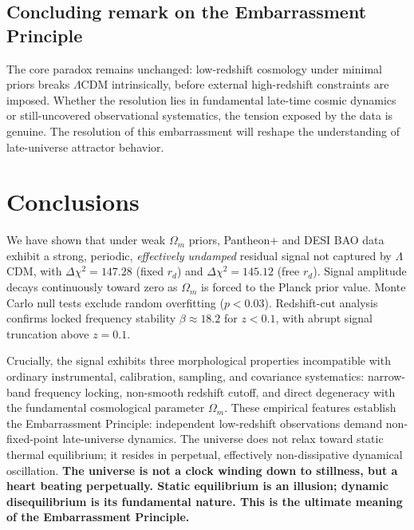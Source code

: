 \documentclass[10pt,a4paper,twocolumn]{article}
\begin{document}
\subsection{Concluding remark on the Embarrassment Principle}
The core paradox remains unchanged: low-redshift cosmology under minimal priors breaks $\Lambda$CDM intrinsically, before external high-redshift constraints are imposed. Whether the resolution lies in fundamental late-time cosmic dynamics or still-uncovered observational systematics, the tension exposed by the data is genuine. The resolution of this embarrassment will reshape the understanding of late-universe attractor behavior.

\section{Conclusions}
We have shown that under weak $\Omega_m$ priors, Pantheon+ and DESI BAO data exhibit a strong, periodic, \emph{effectively undamped} residual signal not captured by $\Lambda$CDM, with $\Delta\chi^2=147.28$ (fixed $r_d$) and $\Delta\chi^2=145.12$ (free $r_d$). Signal amplitude decays continuously toward zero as $\Omega_m$ is forced to the Planck prior value. Monte Carlo null tests exclude random overfitting ($p<0.03$). Redshift-cut analysis confirms locked frequency stability $\beta\approx18.2$ for $z<0.1$, with abrupt signal truncation above $z=0.1$.

Crucially, the signal exhibits three morphological properties incompatible with ordinary instrumental, calibration, sampling, and covariance systematics: narrow-band frequency locking, non-smooth redshift cutoff, and direct degeneracy with the fundamental cosmological parameter $\Omega_m$. These empirical features establish the Embarrassment Principle: independent low-redshift observations demand non-fixed-point late-universe dynamics. The universe does not relax toward static thermal equilibrium; it resides in perpetual, effectively non-dissipative dynamical oscillation.
\textbf{The universe is not a clock winding down to stillness, but a heart beating perpetually. Static equilibrium is an illusion; dynamic disequilibrium is its fundamental nature. This is the ultimate meaning of the Embarrassment Principle.}
\end{document}
